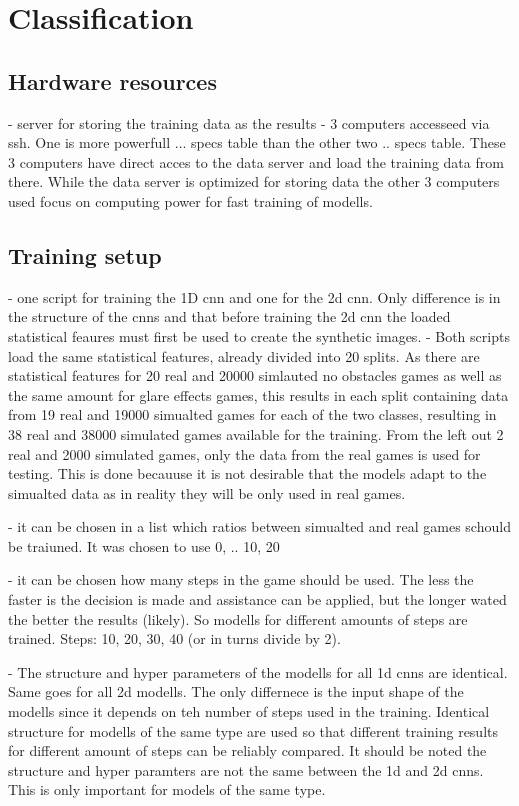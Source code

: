 \chapter{Classification}

\section{Hardware resources}
- server for storing the training data as the results 
- 3 computers accesseed via ssh. One is more powerfull ... specs table than the other two .. specs table. These 3 computers have direct acces to the data server and load the training data from there. While the data server is optimized for storing data the other 3 computers used focus on computing power for fast training of modells. 

\section{Training setup}
- one script for training the 1D cnn and one for the 2d cnn. Only difference is in the structure of the cnns and that before training the 2d cnn the loaded statistical feaures must first be used to create the synthetic images.
- Both scripts load the same statistical features, already divided into 20 splits. As there are statistical features for 20 real and 20000 simlauted no obstacles games as well as the same amount for glare effects games, this results in each split containing data from 19 real and 19000 simualted games for each of the two classes, resulting in 38 real and 38000 simulated games available for the training. From the left out 2 real and 2000 simulated games, only the data from the real games is used for testing. This is done becauuse it is not desirable that the models adapt to the simualted data as in reality they will be only used in real games. 



- it can be chosen in a list which ratios between simualted and real games schould be traiuned. It was chosen to use 0, .. 10, 20

- it can be chosen how many steps in the game should be used. The less the faster is the decision is made and assistance can be applied, but the longer wated the better the results (likely). So modells for different amounts of steps are trained. Steps: 10, 20, 30, 40 (or in turns divide by 2). 

- The structure and hyper parameters of the modells for all 1d cnns are identical. Same goes for all 2d modells. The only differnece is the input shape of the modells since it depends on teh number of steps used in the training. Identical structure for modells of the same type are used so that different training results for different amount of steps can be reliably compared. It should be noted the structure and hyper paramters are not the same between the 1d and 2d cnns. This is only important for models of the same type. 




